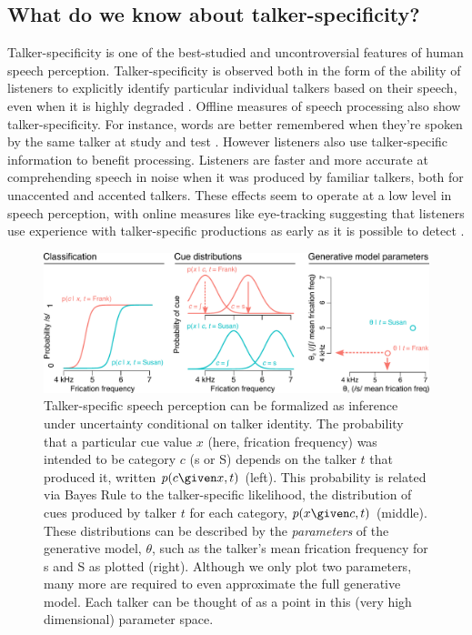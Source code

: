 \subsection{What do we know about talker-specificity?}
\label{sec:what-do-we-know-talker-spec}

Talker-specificity is one of the best-studied and uncontroversial features of human speech perception.  Talker-specificity is observed both in the form of the ability of listeners to explicitly identify particular individual talkers based on their speech, even when it is highly degraded \cite{Bricker1966,Palmeri1993,Remez1997,Sheffert2002}.  Offline measures of speech processing also show talker-specificity.  For instance, words are better remembered when they're spoken by the same talker at study and test \cite{Goldinger1996,Palmeri1993}.  However listeners also use talker-specific information to benefit processing.  Listeners are faster and more accurate at comprehending speech in noise when it was produced by familiar talkers, both for unaccented \cite{Nygaard1998} and accented \cite{Clarke2004} talkers.  These effects seem to operate at a low level in speech perception, with online measures like eye-tracking suggesting that listeners use experience with talker-specific productions as early as it is possible to detect \cite{Creel2008,Mitterer2013}.

\begin{figure}[htb]
  \centering
  \includegraphics[width=\textwidth]{part2-schematics/part2-fig1-assembled.pdf}
  \caption{Talker-specific speech perception can be formalized as inference under uncertainty conditional on talker identity.  The probability that a particular cue value $x$ (here, frication frequency) was intended to be category $c$ (\ph s or \ph S) depends on the talker $t$ that produced it, written $p(c \given x, t)$ (left).  This probability is related via Bayes Rule to the talker-specific likelihood, the distribution of cues produced by talker $t$ for each category, $p(x \given c, t)$ (middle).  These distributions can be described by the \emph{parameters} of the generative model, $\theta$, such as the talker's mean frication frequency for \ph s and \ph S as plotted (right).  Although we only plot two parameters, many more are required to even approximate the full generative model.  Each talker can be thought of as a point in this (very high dimensional) parameter space.}
  \label{fig:gen-model-points}
\end{figure}

